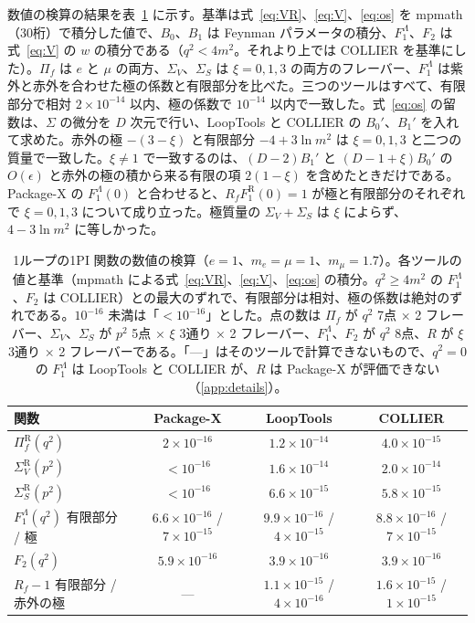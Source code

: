 \documentclass[a4paper,10pt]{ltjsarticle}
\begin{document}
数値の検算の結果を表~\ref{tab:oneloop} に示す。基準は式~\eqref{eq:VR}、\eqref{eq:V}、\eqref{eq:os} を mpmath（30桁）で積分した値で、$B_0$、$B_1$ は Feynman パラメータの積分、$F_1^\Lambda$、$F_2$ は式~\eqref{eq:V} の $w$ の積分である（$q^2<4m^2$。それより上では COLLIER を基準にした）。$\Pi_f$ は $e$ と $\mu$ の両方、$\Sigma_V$、$\Sigma_S$ は $\xi=0,1,3$ の両方のフレーバー、$F_1^\Lambda$ は紫外と赤外を合わせた極の係数と有限部分を比べた。三つのツールはすべて、有限部分で相対 $2\times10^{-14}$ 以内、極の係数で $10^{-14}$ 以内で一致した。式~\eqref{eq:os} の留数は、$\Sigma$ の微分を $D$ 次元で行い、LoopTools と COLLIER の $B_0'$、$B_1'$ を入れて求めた。赤外の極 $-(3-\xi)$ と有限部分 $-4+3\ln m^2$ は $\xi=0,1,3$ と二つの質量で一致した。$\xi\ne1$ で一致するのは、$(D-2)B_1'$ と $(D-1+\xi)B_0'$ の $O(\epsilon)$ と赤外の極の積から来る有限の項 $2(1-\xi)$ を含めたときだけである。Package-X の $F_1^\Lambda(0)$ と合わせると、$R_fF_1^{\mathrm R}(0)=1$ が極と有限部分のそれぞれで $\xi=0,1,3$ について成り立った。極質量の $\Sigma_V+\Sigma_S$ は $\xi$ によらず、$4-3\ln m^2$ に等しかった。

\begin{table}[tbp]
\centering\small
\caption{1ループの1PI 関数の数値の検算（$e=1$、$m_e=\mu=1$、$m_\mu=1.7$）。各ツールの値と基準（mpmath による式~\eqref{eq:VR}、\eqref{eq:V}、\eqref{eq:os} の積分。$q^2\ge4m^2$ の $F_1^\Lambda$、$F_2$ は COLLIER）との最大のずれで、有限部分は相対、極の係数は絶対のずれである。$10^{-16}$ 未満は「$<10^{-16}$」とした。点の数は $\Pi_f$ が $q^2$ 7点 × 2 フレーバー、$\Sigma_V$、$\Sigma_S$ が $p^2$ 5点 × $\xi$ 3通り × 2 フレーバー、$F_1^\Lambda$、$F_2$ が $q^2$ 8点、$R$ が $\xi$ 3通り × 2 フレーバーである。「—」はそのツールで計算できないもので、$q^2=0$ の $F_1^\Lambda$ は LoopTools と COLLIER が、$R$ は Package-X が評価できない（\ref{app:details}）。}
\label{tab:oneloop}
\begin{tabular}{lccc}
\toprule
関数 & Package-X & LoopTools & COLLIER \\
\midrule
$\Pi_f^{\mathrm R}(q^2)$ & $2\times10^{-16}$ & $1.2\times10^{-14}$ & $4.0\times10^{-15}$ \\
$\Sigma_V^{\mathrm R}(p^2)$ & $<10^{-16}$ & $1.6\times10^{-14}$ & $2.0\times10^{-14}$ \\
$\Sigma_S^{\mathrm R}(p^2)$ & $<10^{-16}$ & $6.6\times10^{-15}$ & $5.8\times10^{-15}$ \\
$F_1^\Lambda(q^2)$ 有限部分 / 極 & $6.6\times10^{-16}$ / $7\times10^{-15}$ & $9.9\times10^{-16}$ / $4\times10^{-15}$ & $8.8\times10^{-16}$ / $7\times10^{-15}$ \\
$F_2(q^2)$ & $5.9\times10^{-16}$ & $3.9\times10^{-16}$ & $3.9\times10^{-16}$ \\
$R_f-1$ 有限部分 / 赤外の極 & — & $1.1\times10^{-15}$ / $4\times10^{-16}$ & $1.6\times10^{-15}$ / $1\times10^{-15}$ \\
\bottomrule
\end{tabular}
\end{table}
\end{document}
